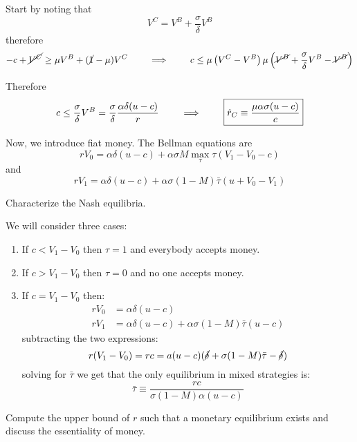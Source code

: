 \documentclass[12pt]{amsart}
\begin{document}
{%
\begin{answer}
    Start by noting that $$V^C = V^B + \frac{\sigma}{\delta}V^B$$
   therefore $$-c + \cancel{V^C} \geq \mu V^B + (\cancel{1}-\mu) V^C \qquad \implies \qquad c\leq \mu\left(V^C - V^B\right)  \mu\left(\cancel{V^B} + \frac{\sigma}{\delta}V^B - \cancel{V^B}\right)$$
   
   Therefore 
   $$ c\leq \frac{\sigma}{\delta}V^B = \frac{\sigma}{\delta} \frac{\alpha \delta(u-c)}{r} \qquad \implies \qquad \boxed{\hat{r}_{C} \equiv \frac{\mu \alpha \sigma(u-c)}{c} }$$
\end{answer}

\begin{exercise}
    Now, we introduce fiat money. The Bellman equations are
    $$
        r V_{0}=\alpha \delta(u-c)+\alpha \sigma M \max _{\tau} \tau\left(V_{1}-V_{0}-c\right)
    $$
    and
    $$
        r V_{1}=\alpha \delta(u-c)+\alpha \sigma(1-M) \bar{\tau}\left(u+V_{0}-V_{1}\right)
    $$
\end{exercise}

\begin{subexercise}
    Characterize the Nash equilibria.
\end{subexercise}

\begin{answer}
    We will consider three cases:
\begin{enumerate}
    \item If $c < V_1 - V_0$ then $\tau = 1$ and everybody accepts money.
    \item If $c > V_1 - V_0$ then $\tau = 0$ and no one accepts money.
    \item If $c = V_1 - V_0$ then:
    \begin{align*}
        r V_0 &= \alpha \delta (u-c) \\
        r V_1 &= \alpha \delta(u-c)+\alpha \sigma(1-M) \bar{\tau}\left(u-c\right)
    \end{align*}
    subtracting the two expressions:
    $$r(V_1 - V_0) = r c = a(u-c)(\cancel{\delta} + \sigma(1-M)\bar{\tau} - \cancel{\delta})$$
    solving for $\bar{\tau}$ we get that the only equilibrium in mixed strategies is:
    $$\bar{\tau} \equiv \frac{r c}{\sigma (1-M)\alpha (u-c)}$$
\end{enumerate}
\end{answer}

\begin{subexercise}
    Compute the upper bound of $r$ such that a monetary equilibrium exists and discuss the essentiality of money.
\end{subexercise}

}
\end{document}
